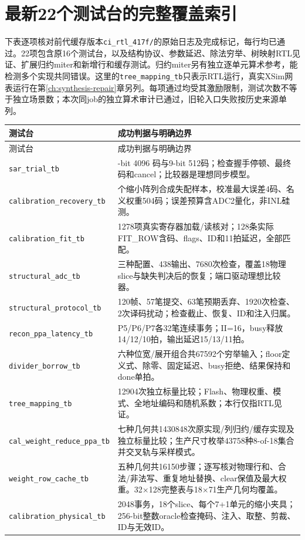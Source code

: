 \documentclass[UTF8,fontset=fandol,11pt,a4paper,openany]{ctexrep}
\newcommand{\code}[1]{\nolinkurl{#1}}
\begin{document}
\section{最新22个测试台的完整覆盖索引}
下表逐项核对前代缓存版本\code{ci_rtl_417f/}的原始日志及完成标记，每行均已通过。22项包含原16个测试台，以及结构协议、参数延迟、除法穷举、树映射RTL见证、扩展归约miter和新增行和缓存测试。归约miter另有独立逐单元算术参考，能检测多个实现共同错误。这里的\code{tree_mapping_tb}只表示RTL运行，真实XSim网表运行在第\ref{ch:synthesis-repair}章另列。每项通过均受其激励限制，测试次数不等于独立场景数；本次同job的独立算术审计已通过，旧轮入口失败按历史来源单列。
\small
\begin{longtable}{>{\raggedright\arraybackslash}p{46mm}>{\raggedright\arraybackslash}p{108mm}}
\toprule 测试台&成功判据与明确边界\\\midrule\endfirsthead
\toprule 测试台&成功判据与明确边界\\\midrule\endhead
\code{sar_trial_tb}&12-bit 4096 码与9-bit 512码；检查握手停顿、最终码和cancel；比较器是理想同步模型。\\
\code{calibration_recovery_tb}&2048 个缩小阵列合成失配样本，校准最大误差4码、名义权重504码；误差预算含ADC2量化，非INL硅测。\\
\code{calibration_fit_tb}&1278项真实寄存器加载/读核对；128条实际FIT\_ROW含码、flags、ID和11拍延迟，全部匹配。\\
\code{structural_adc_tb}&三种配置、438输出、7680次检查，覆盖18物理slice与缺失判决后的恢复；端口驱动理想比较器。\\
\code{structural_protocol_tb}&120帧、57笔提交、63笔预期丢弃、1920次检查、2次译码扰动；检查截止、恢复、ID和注入归属。\\
\code{recon_ppa_latency_tb}&P5/P6/P7各32笔连续事务；II=16，busy释放14/12/10拍，输出延迟15/13/11拍。\\
\code{divider_borrow_tb}&六种位宽/展开组合共67592个穷举输入；floor定义式、除零、固定延迟、busy拒绝、结果保持和done单拍。\\
\code{tree_mapping_tb}&12904次独立标量比较；Flash、物理权重、模式、全地址编码和随机系数；本行仅指RTL见证。\\
\code{cal_weight_reduce_ppa_tb}&七种几何共1430848次原实现/列归约/缓存实现及独立标量比较；生产尺寸枚举43758种8-of-18集合并交叉轨与采样模式。\\
\code{weight_row_cache_tb}&五种几何共16150步骤；逐写核对物理行和、合法/非法写、重复地址替换、clear保值及最大权重。32$\times$128完整表与18$\times$71生产几何均覆盖。\\
\code{calibration_physical_tb}&2048事务，18个slice、每个7+1单元的缩小夹具；256-bit整数oracle检查掩码、注入、取整、剪裁、ID与无效ID。\\

\end{longtable}
\end{document}
